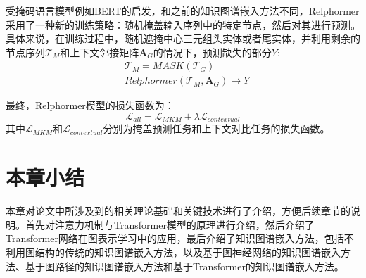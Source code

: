 受掩码语言模型例如BERT的启发，和之前的知识图谱嵌入方法不同，Relphormer采用了一种新的训练策略：随机掩盖输入序列中的特定节点，然后对其进行预测。具体来说，在训练过程中，随机遮掩中心三元组头实体或者尾实体，并利用剩余的节点序列$\mathcal{T}_M$和上下文邻接矩阵$\mathbf{A}_G$的情况下，预测缺失的部分$Y$:
\begin{equation}
  \begin{aligned}
    &\mathcal{T}_M = MASK(\mathcal{T}_G)\\
    &Relphormer(\mathcal{T}_M,\mathbf{A}_G)\rightarrow Y
  \end{aligned}
\end{equation}

最终，Relphormer模型的损失函数为：
\begin{equation}
  \mathcal{L}_{all} = \mathcal{L}_{MKM}+\lambda \mathcal{L}_{contextual}
\end{equation}
其中$\mathcal{L}_{MKM}$和$\mathcal{L}_{contextual}$分别为掩盖预测任务和上下文对比任务的损失函数。


\section{本章小结}

本章对论文中所涉及到的相关理论基础和关键技术进行了介绍，方便后续章节的说明。首先对注意力机制与Transformer模型的原理进行介绍，然后介绍了Transformer网络在图表示学习中的应用，最后介绍了知识图谱嵌入方法，包括不利用图结构的传统的知识图谱嵌入方法，以及基于图神经网络的知识图谱嵌入方法、基于图路径的知识图谱嵌入方法和基于Transformer的知识图谱嵌入方法。